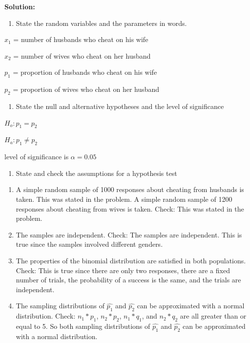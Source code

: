 \documentclass[]{book}
\providecommand{\tightlist}{%
  \setlength{\itemsep}{0pt}\setlength{\parskip}{0pt}}
\begin{document}
\textbf{Solution:}

\begin{enumerate}
\def\labelenumi{\arabic{enumi}.}
\tightlist
\item
  State the random variables and the parameters in words.
\end{enumerate}

\(x_1\) = number of husbands who cheat on his wife

\(x_2\) = number of wives who cheat on her husband

\(p_1\) = proportion of husbands who cheat on his wife

\(p_2\) = proportion of wives who cheat on her husband

\begin{enumerate}
\def\labelenumi{\arabic{enumi}.}
\setcounter{enumi}{1}
\tightlist
\item
  State the null and alternative hypotheses and the level of significance
\end{enumerate}

\(H_o: p_1=p_2\)

\(H_a: p_1\ne p_2\)

level of significance is \(\alpha=0.05\)

\begin{enumerate}
\def\labelenumi{\arabic{enumi}.}
\setcounter{enumi}{2}
\tightlist
\item
  State and check the assumptions for a hypothesis test
\end{enumerate}

\begin{enumerate}
\def\labelenumi{\alph{enumi}.}
\item
  A simple random sample of 1000 responses about cheating from husbands is taken. This was stated in the problem. A simple random sample of 1200 responses about cheating from wives is taken. Check: This was stated in the problem.
\item
  The samples are independent. Check: The samples are independent. This is true since the samples involved different genders.
\item
  The properties of the binomial distribution are satisfied in both populations. Check: This is true since there are only two responses, there are a fixed number of trials, the probability of a success is the same, and the trials are independent.
\item
  The sampling distributions of \(\hat{p_1}\) and \(\hat{p_2}\) can be approximated with a normal distribution. Check: \(n_1*p_1\), \(n_2*p_2\), \(n_1*q_1\), and \(n_2*q_2\) are all greater than or equal to 5. So both sampling distributions of \(\hat{p_1}\) and \(\hat{p_2}\) can be approximated with a normal distribution.
\end{enumerate}
\end{document}
